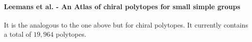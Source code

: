 \paragraph{Leemans et al. - An Atlas of chiral polytopes for small simple groups} It is the analogous to the one above but for chiral polytopes. It currently contains a total of $19,964$ polytopes.








%
%
%
%
